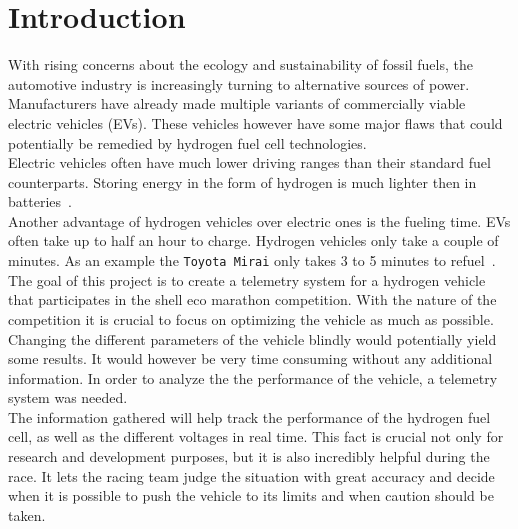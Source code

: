 \clearpage
\section{Introduction}

With rising concerns about the ecology and sustainability of fossil fuels, the
automotive industry is increasingly turning to alternative sources of power.
Manufacturers have already made multiple variants of commercially viable
electric vehicles (EVs). These vehicles however have some major flaws that
could potentially be remedied by hydrogen fuel cell technologies.\\

Electric vehicles often have much lower driving ranges than their standard fuel
counterparts. Storing energy in the form of hydrogen is much lighter then in
batteries~\cite{hydrogen-fuel-cell-technology}.\\

Another advantage of hydrogen vehicles over electric ones is the fueling time.
EVs often take up to half an hour to charge. Hydrogen vehicles only take a
couple of minutes. As an example the \verb|Toyota Mirai| only takes
3 to 5 minutes to refuel~\cite{toyota-mirai-wikipedia}.\\

The goal of this project is to create a telemetry system for a hydrogen vehicle
that participates in the shell eco marathon competition. With the nature of the
competition it is crucial to focus on optimizing the vehicle as much as
possible.\\

Changing the different parameters of the vehicle blindly would potentially
yield some results. It would however be very time consuming without any
additional information. In order to analyze the the performance of the vehicle,
a telemetry system was needed.\\

The information gathered will help track the performance of the hydrogen fuel
cell, as well as the different voltages in real time. This fact is crucial not
only for research and development purposes, but it is also incredibly helpful
during the race. It lets the racing team judge the situation with great
accuracy and decide when it is possible to push the vehicle to its limits and
when caution should be taken.